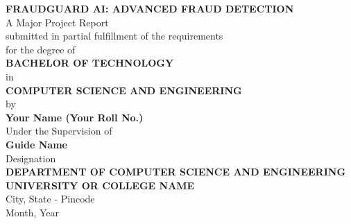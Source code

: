 \documentclass[12pt, a4paper]{report}
\begin{document}
\begin{titlepage}
\thispagestyle{empty}


\begin{center}
    \vspace*{2cm}
    
    {\fontsize{18}{21.6}\bfseries \MakeUppercase{FraudGuard AI: Advanced Fraud Detection}}\\[1.5cm]
    
    {\fontsize{14}{16.8} A Major Project Report}\\[0.5cm]
    {\fontsize{12}{14.4} submitted in partial fulfillment of the requirements}\\[0.5cm]
    {\fontsize{12}{14.4} for the degree of}\\[1.5cm]
    
    {\fontsize{14}{16.8}\bfseries BACHELOR OF TECHNOLOGY}\\[0.5cm]
    {\fontsize{12}{14.4} in}\\[0.5cm]
    {\fontsize{14}{16.8}\bfseries COMPUTER SCIENCE AND ENGINEERING}\\[1.5cm]
    
    {\fontsize{12}{14.4} by}\\[0.5cm]
    {\fontsize{14}{16.8}\bfseries Your Name (Your Roll No.)}\\[1.5cm]
    
    {\fontsize{12}{14.4} Under the Supervision of}\\[0.5cm]
    {\fontsize{14}{16.8}\bfseries Guide Name}\\[0.5cm]
    {\fontsize{12}{14.4} Designation}\\[2cm]
    
    
    {\fontsize{14}{16.8}\bfseries DEPARTMENT OF COMPUTER SCIENCE AND ENGINEERING}\\[0.5cm]
    {\fontsize{14}{16.8}\bfseries UNIVERSITY OR COLLEGE NAME}\\[0.5cm]
    {\fontsize{12}{14.4} City, State - Pincode}\\[0.5cm]
    {\fontsize{12}{14.4} Month, Year}
    
\end{center}
\end{titlepage}
\end{document}
